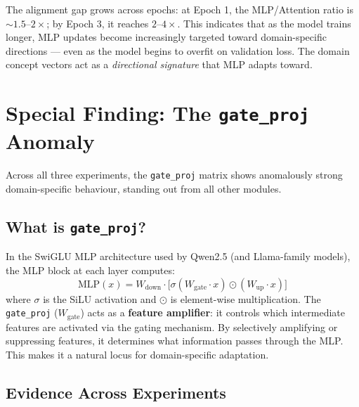 \documentclass[11pt,a4paper]{article}
\begin{document}
The alignment gap grows across epochs: at Epoch 1, the MLP/Attention ratio is ${\sim}1.5\text{--}2\times$; by Epoch 3, it reaches $2\text{--}4\times$. This indicates that as the model trains longer, MLP updates become increasingly targeted toward domain-specific directions --- even as the model begins to overfit on validation loss. The domain concept vectors act as a \emph{directional signature} that MLP adapts toward.


\section{Special Finding: The \texttt{gate\_proj} Anomaly}
\label{sec:gate}

Across all three experiments, the \texttt{gate\_proj} matrix shows anomalously strong domain-specific behaviour, standing out from all other modules.

\subsection{What is \texttt{gate\_proj}?}

In the SwiGLU MLP architecture used by Qwen2.5 (and Llama-family models), the MLP block at each layer computes:
\[
\text{MLP}(x) = W_{\text{down}} \cdot \bigl[\sigma(W_{\text{gate}} \cdot x) \odot (W_{\text{up}} \cdot x)\bigr]
\]
where $\sigma$ is the SiLU activation and $\odot$ is element-wise multiplication. The \texttt{gate\_proj} ($W_{\text{gate}}$) acts as a \textbf{feature amplifier}: it controls which intermediate features are activated via the gating mechanism. By selectively amplifying or suppressing features, it determines what information passes through the MLP. This makes it a natural locus for domain-specific adaptation.

\subsection{Evidence Across Experiments}
\end{document}
